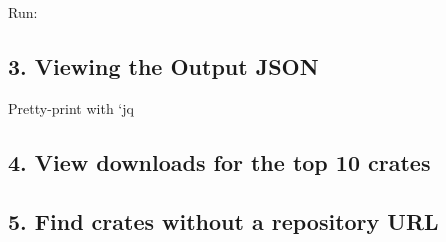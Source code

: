 \documentclass[
  letterpaper,
  DIV=11,
  numbers=noendperiod]{scrreprt}
\newenvironment{Shaded}{\begin{snugshade}}{\end{snugshade}}
\newcommand{\AttributeTok}[1]{\textcolor[rgb]{0.40,0.45,0.13}{#1}}
\newcommand{\ExtensionTok}[1]{\textcolor[rgb]{0.00,0.23,0.31}{#1}}
\newcommand{\NormalTok}[1]{\textcolor[rgb]{0.00,0.23,0.31}{#1}}
\newcommand{\OperatorTok}[1]{\textcolor[rgb]{0.37,0.37,0.37}{#1}}
\newcommand{\StringTok}[1]{\textcolor[rgb]{0.13,0.47,0.30}{#1}}
\begin{document}
Run:

\begin{Shaded}
\end{Shaded}

\subsection{3. Viewing the Output JSON}\label{viewing-the-output-json}

Pretty-print with `jq

\begin{Shaded}
\end{Shaded}

\subsection{4. View downloads for the top 10
crates}\label{view-downloads-for-the-top-10-crates}

\begin{Shaded}
\end{Shaded}

\subsection{5. Find crates without a repository
URL}\label{find-crates-without-a-repository-url}

\begin{Shaded}
\end{Shaded}
\end{document}
